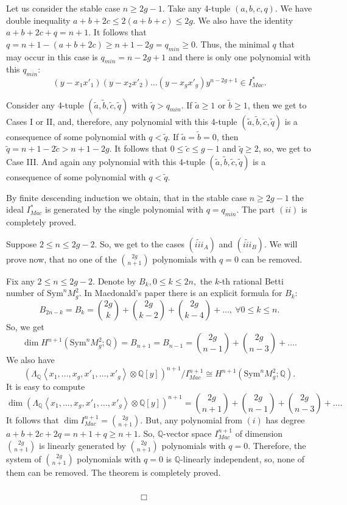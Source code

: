 \documentclass[a4paper,14pt]{article}
\newcommand{\Sym}{\mathrm{Sym}}
\newcommand{\Q}{\mathbb{Q}}
\begin{document}
Let us consider the stable case $n\ge 2g -1.$ Take any 4-tuple $(a,b,c,q)$. We have double inequality $a+b+2c\le 2(a+b+c)\le 2g$. We also have the identity $a+b+2c+q=n+1$. It follows that $q= n+1 - (a+b+2c)\ge n+1 - 2g=q_{min}\ge 0$. Thus, the minimal $q$ that may occur in this case is $q_{min}=n-2g+1$ and there is only one polynomial with this $q_{min}$:
$$
(y-x_1x'_1)(y-x_2x'_2)\ldots (y-x_gx'_g)y^{n-2g+1} \in I^*_{Mac}.
$$ 

Consider any 4-tuple $(\tilde{a},\tilde{b},\tilde{c},\tilde{q})$ with $\tilde{q}>q_{min}$. If $\tilde{a}\ge 1$ or $\tilde{b}\ge 1$, then we get to Cases I or II, and, therefore, any polynomial with this 4-tuple $(\tilde{a},\tilde{b},\tilde{c},\tilde{q})$ is a consequence of some polynomial with $q<\tilde{q}$. If $\tilde{a}=\tilde{b}=0$, then $\tilde{q}=n+1-2\tilde{c}> n+1 - 2g$. It follows that $0\le \tilde{c}\le g-1$ and $\tilde{q}\ge 2$, so, we get to Case III. And again any polynomial with this 4-tuple $(\tilde{a},\tilde{b},\tilde{c},\tilde{q})$ is a consequence of some polynomial  with $q<\tilde{q}$. 

By finite descending induction we obtain, that in the stable case $n\ge 2g -1$ the ideal $I^*_{Mac}$ is generated by the single polynomial with $q=q_{min}$. The part $(ii)$ is completely proved.  

Suppose $2\le n\le 2g-2$. So, we get to the cases $(\widetilde{iii}_A)$ and $(\widetilde{iii}_B)$. We will prove now, that no one of the $\binom{2g}{n+1}$ polynomials with $q=0$ can be removed.

Fix any $2\le n \le 2g-2$. Denote by $B_k, 0\le k\le 2n,$ the $k$-th rational Betti number of $\Sym^n M^2_g$. In Macdonald's paper there is an explicit formula for $B_k$:
$$
B_{2n-k} = B_k = \binom{2g}{k} + \binom{2g}{k-2} + \binom{2g}{k-4} + \ldots, \ \forall 0\le k\le n.
$$
So, we get 
$$
\dim H^{n+1}(\Sym^n M^2_g;\Q) = B_{n+1} = B_{n-1} = \binom{2g}{n-1} + \binom{2g}{n-3} + \ldots.
$$
We also have
$$
(\Lambda_{\Q} \left< x_1,\ldots,x_g,x'_1,\ldots,x'_g \right>\otimes \Q[y])^{n+1}/ I^{n+1}_{Mac} \cong H^{n+1}(\Sym^n M^2_g;\Q).
$$
It is easy to compute
$$
\dim (\Lambda_{\Q} \left< x_1,\ldots,x_g,x'_1,\ldots,x'_g \right>\otimes \Q[y])^{n+1} = \binom{2g}{n+1} + \binom{2g}{n-1} + \binom{2g}{n-3} + \ldots.
$$
It follows that $\dim I^{n+1}_{Mac} = \binom{2g}{n+1}$. But, any polynomial from $(i)$ has degree $a+b+2c+2q = n + 1 + q\ge n+1$. So, $\Q$-vector space $I^{n+1}_{Mac}$ of dimension $\binom{2g}{n+1}$ is linearly generated by $\binom{2g}{n+1}$ polynomials with $q=0$. Therefore, the system of $\binom{2g}{n+1}$ polynomials with $q=0$ is $\Q$-linearly independent, so, none of them can be removed. The theorem is completely proved.  \ \ \ \ \ \  \ \ \ \ \ \ \ \ \ \ \ \ \ \ \ \ \ \ \ \ \ \ \ \ \ \ \ \ \ \ \ \ \ \ \ \ \ \ \ \ \ \ \ \ \ \ \ \ \ \ \ \ \ \ \ \ \ \ \ \  \ \ \ \ \ \ \ \ \ \  \ \ \ \ \ \ \ \ \ \  \ \ \ \ \ \ \ \ \ \ \ \ \ \ \ \ \   $\Box$
\end{document}
